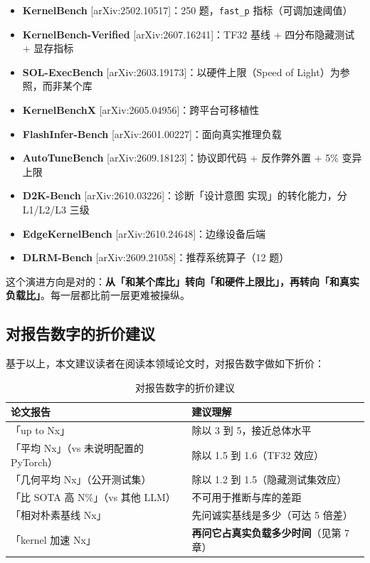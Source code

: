 \begin{itemize}
  \item \textbf{KernelBench} [arXiv:2502.10517]：250 题，\texttt{fast\_p} 指标（可调加速阈值）
  \item \textbf{KernelBench-Verified} [arXiv:2607.16241]：TF32 基线 + 四分布隐藏测试 + 显存指标
  \item \textbf{SOL-ExecBench} [arXiv:2603.19173]：以硬件上限（Speed of Light）为参照，而非某个库
  \item \textbf{KernelBenchX} [arXiv:2605.04956]：跨平台可移植性
  \item \textbf{FlashInfer-Bench} [arXiv:2601.00227]：面向真实推理负载
  \item \textbf{AutoTuneBench} [arXiv:2609.18123]：协议即代码 + 反作弊外置 + 5\% 变异上限
  \item \textbf{D2K-Bench} [arXiv:2610.03226]：诊断「设计意图  实现」的转化能力，分 L1/L2/L3 三级
  \item \textbf{EdgeKernelBench} [arXiv:2610.24648]：边缘设备后端
  \item \textbf{DLRM-Bench} [arXiv:2609.21058]：推荐系统算子（12 题）
\end{itemize}

这个演进方向是对的：\textbf{从「和某个库比」转向「和硬件上限比」，再转向「和真实负载比」}。每一层都比前一层更难被操纵。


\subsection{对报告数字的折价建议}

基于以上，本文建议读者在阅读本领域论文时，对报告数字做如下折价：


\begin{table}[t]
\centering
\footnotesize
\setlength{\tabcolsep}{4pt}
\caption{对报告数字的折价建议}
\label{tab:10}
\begin{tabularx}{\textwidth}{Xl}
\toprule
论文报告 & 建议理解 \\
\midrule
「up to Nx」 & 除以 3 到 5，接近总体水平 \\
「平均 Nx」（vs 未说明配置的 PyTorch） & 除以 1.5 到 1.6（TF32 效应） \\
「几何平均 Nx」（公开测试集） & 除以 1.2 到 1.5（隐藏测试集效应） \\
「比 SOTA 高 N\%」（vs 其他 LLM） & 不可用于推断与库的差距 \\
「相对朴素基线 Nx」 & 先问诚实基线是多少（可达 5 倍差） \\
「kernel 加速 Nx」 & \textbf{再问它占真实负载多少时间}（见第 7 章） \\
\bottomrule
\end{tabularx}
\end{table}




